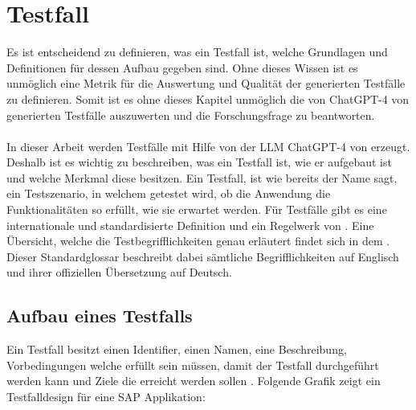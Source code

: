 \documentclass[12pt,toc=bib,toc=listof]{scrreprt}
\begin{document}
\section{Testfall} %
\label{sec:testfall}
Es ist entscheidend zu definieren, was ein Testfall ist, welche Grundlagen und Definitionen für dessen Aufbau gegeben sind. Ohne dieses Wissen ist es unmöglich eine Metrik für die Auswertung und Qualität der generierten Testfälle zu definieren. Somit ist es ohne dieses Kapitel unmöglich die von ChatGPT-4 von \textcite{OpenAI2025} generierten Testfälle auszuwerten und die Forschungsfrage zu beantworten.\\
\\
In dieser Arbeit werden Testfälle mit Hilfe von der LLM ChatGPT-4 von \textcite{OpenAI2025} erzeugt. Deshalb ist es wichtig zu beschreiben, was ein Testfall ist, wie er aufgebaut ist und welche Merkmal diese besitzen. Ein Testfall, ist wie bereits der Name sagt, ein Testszenario, in welchem getestet wird, ob die Anwendung die Funktionalitäten so erfüllt, wie sie erwartet werden. Für Testfälle gibt es eine internationale und standardisierte Definition und ein Regelwerk von \textcite{IsoIecIeee2024}. Eine Übersicht, welche die Testbegrifflichkeiten genau erläutert findet sich in dem \textcite{Istqb2017}. Dieser Standardglossar beschreibt dabei sämtliche Begrifflichkeiten auf Englisch und ihrer offiziellen Übersetzung auf Deutsch.
\newpage

\subsection{Aufbau eines Testfalls} %
\label{sec:aufbauEinesTestfalls}
Ein Testfall besitzt einen Identifier, einen Namen, eine Beschreibung, Vorbedingungen welche erfüllt sein müssen, damit der Testfall durchgeführt werden kann und Ziele die erreicht werden sollen \textcite{IsoIecIeee2024}. Folgende Grafik zeigt ein Testfalldesign für eine SAP Applikation:
\end{document}
